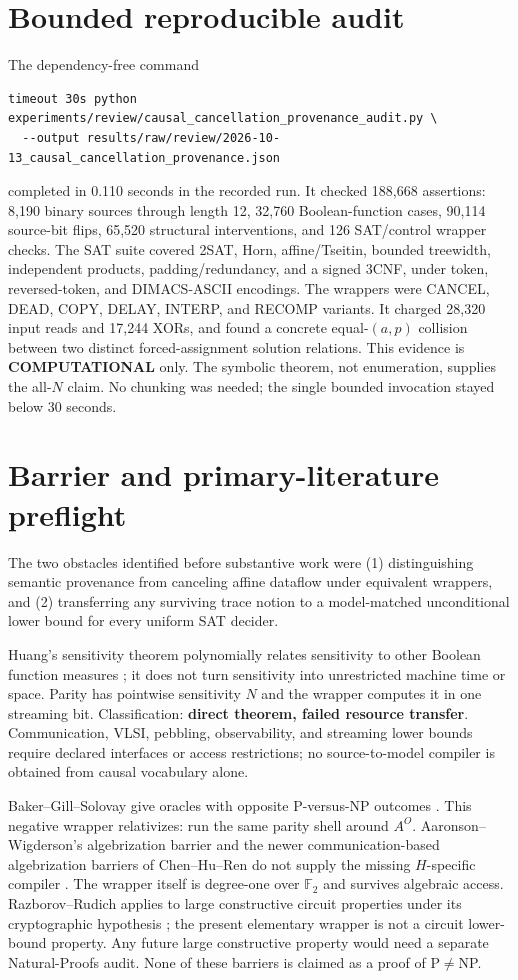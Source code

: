 \documentclass[11pt]{article}
\newcommand{\COMP}{\textbf{COMPUTATIONAL}}
\begin{document}
\section{Bounded reproducible audit}
The dependency-free command
\begin{verbatim}
timeout 30s python experiments/review/causal_cancellation_provenance_audit.py \
  --output results/raw/review/2026-10-13_causal_cancellation_provenance.json
\end{verbatim}
completed in 0.110 seconds in the recorded run.  It checked 188,668 assertions:
8,190 binary sources through length 12, 32,760 Boolean-function cases, 90,114
source-bit flips, 65,520 structural interventions, and 126 SAT/control wrapper
checks.  The SAT suite covered 2SAT, Horn, affine/Tseitin, bounded treewidth,
independent products, padding/redundancy, and a signed 3CNF, under token,
reversed-token, and DIMACS-ASCII encodings.  The wrappers were CANCEL, DEAD,
COPY, DELAY, INTERP, and RECOMP variants.  It charged 28,320 input reads and
17,244 XORs, and found a concrete equal-$(a,p)$ collision between two distinct
forced-assignment solution relations.  This evidence is \COMP{} only.  The
symbolic theorem, not enumeration, supplies the all-$N$ claim.  No chunking
was needed; the single bounded invocation stayed below 30 seconds.

\section{Barrier and primary-literature preflight}
The two obstacles identified before substantive work were (1) distinguishing
semantic provenance from canceling affine dataflow under equivalent wrappers,
and (2) transferring any surviving trace notion to a model-matched
unconditional lower bound for every uniform SAT decider.

Huang's sensitivity theorem polynomially relates sensitivity to other Boolean
function measures \cite{huang}; it does not turn sensitivity into unrestricted
machine time or space.  Parity has pointwise sensitivity $N$ and the wrapper
computes it in one streaming bit.  Classification: \textbf{direct theorem,
failed resource transfer}.  Communication, VLSI, pebbling, observability, and
streaming lower bounds require declared interfaces or access restrictions;
no source-to-model compiler is obtained from causal vocabulary alone.

Baker--Gill--Solovay give oracles with opposite P-versus-NP outcomes
\cite{bgs}.  This negative wrapper relativizes: run the same parity shell
around $A^O$.  Aaronson--Wigderson's algebrization barrier and the newer
communication-based algebrization barriers of Chen--Hu--Ren do not supply the
missing $H$-specific compiler \cite{aw,chr}.  The wrapper itself is degree-one
over $\mathbb F_2$ and survives algebraic access.  Razborov--Rudich applies to
large constructive circuit properties under its cryptographic hypothesis
\cite{rr}; the present elementary wrapper is not a circuit lower-bound
property.  Any future large constructive property would need a separate
Natural-Proofs audit.  None of these barriers is claimed as a proof of
P$\ne$NP.
\end{document}
